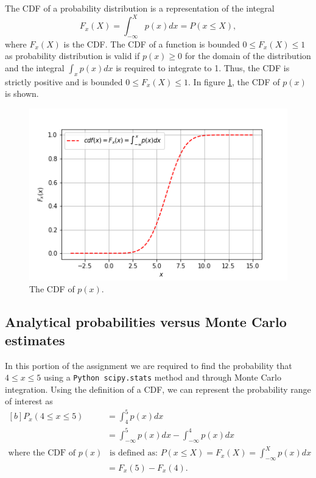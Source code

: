 \documentclass{article}
\begin{document}
The CDF of a probability distribution is a representation of the integral
\begin{equation}
    F_x(X) = \int_{-\infty}^{X}p(x)dx = P(x \leq X),
\end{equation}
where $F_x(X)$ is the CDF. The CDF of a function is bounded $0 \leq F_x(X) \leq 1$ as probability distribution is valid if $p(x)\geq 0$ for the domain of the distribution and the integral $\int_x p(x)dx$ is required to integrate to 1. Thus, the CDF is strictly positive and is bounded $0 \leq F_x(X) \leq 1$. In figure \ref{fig:Q1a_2}, the CDF of $p(x)$ is shown.
\begin{figure}
    \centering
    \includegraphics[scale=0.5]{Q1a_fig4.png}
    \caption{The CDF of $p(x)$.}
    \label{fig:Q1a_2}
\end{figure}

\subsection{Analytical probabilities versus Monte Carlo estimates}

In this portion of the assignment we are required to find the probability that $4 \leq x \leq 5$ using a \texttt{Python scipy.stats} method and through Monte Carlo integration. Using the definition of a CDF, we can represent the probability range of interest as
\begin{equation}\label{eq:p_4_x_5}
\begin{aligned}[b]
P_x(4 \leq x \leq 5) &= \int_{4}^{5} p(x) dx \\
&= \int_{-\infty}^{5} p(x)dx - \int_{-\infty}^{4} p(x) dx \\
\text{where the CDF of } p(x) &\text{ is defined as: } P(x \leq X) = F_x(X) = \int_{-\infty}^{X}p(x)dx \\
&= F_x(5) - F_x(4). \\
\end{aligned}
\end{equation}
\end{document}
